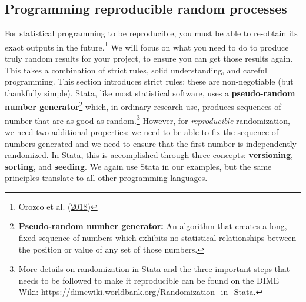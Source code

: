 \documentclass[
]{book}
\begin{document}
\hypertarget{programming-reproducible-random-processes}{%
\subsection*{Programming reproducible random processes}\label{programming-reproducible-random-processes}}

For statistical programming to be reproducible,
you must be able to re-obtain its exact outputs in the future.\footnote{Orozco et al. (\protect\hyperlink{ref-orozco2018make}{2018})}
We will focus on what you need to do to produce
truly random results for your project,
to ensure you can get those results again.
This takes a combination of strict rules, solid understanding, and careful programming.
This section introduces strict rules:
these are non-negotiable (but thankfully simple).
Stata, like most statistical software, uses a \textbf{pseudo-random number generator}\footnote{\textbf{Pseudo-random number generator:} An algorithm that creates a long, fixed sequence of numbers
  which exhibits no statistical relationships between the position or value of any set of those numbers.}
which, in ordinary research use,
produces sequences of number that are as good as random.\footnote{More details on randomization in Stata
  and the three important steps that needs to be followed
  to make it reproducible can be found on the DIME Wiki:
  \url{https://dimewiki.worldbank.org/Randomization_in_Stata}.}
However, for \emph{reproducible} randomization, we need two additional properties:
we need to be able to fix the sequence of numbers generated and
we need to ensure that the first number is independently randomized.
In Stata, this is accomplished through three concepts:
\textbf{versioning}, \textbf{sorting}, and \textbf{seeding}.
We again use Stata in our examples,
but the same principles translate to all other programming languages.
\end{document}
